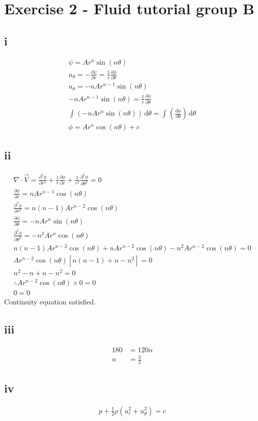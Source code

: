 \documentclass[class=report, crop=false, 12pt,a4paper]{standalone}
\begin{document}
\section*{Exercise 2 - Fluid tutorial group B}
\subsection*{i}
\begin{gather}
  \psi = A r^n \sin(n \theta)\\
  u_\theta = -\frac{\partial \psi }{\partial r}  = \frac{1}{r} \frac{\partial \phi }{\partial \theta } \\
  u_\theta = -nAr^{n-1} \sin(n\theta)\\
  -nAr^{n-1} \sin(n\theta) = \frac{1}{r} \frac{\partial \phi }{\partial \theta }\\
  \int_{}^{} \left( -nAr^{n} \sin(n\theta) \right) \,\mathrm{d}\theta = \int_{}^{} \left( \frac{\partial \phi }{\partial \theta } \right) \,\mathrm{d}\theta \\
  \phi = Ar^n\cos(n\theta) + c 
\end{gather}
\subsection*{ii}
\begin{gather}
  \nabla \cdot \vec{V} = \frac{\partial^2 \phi}{\partial r^2} + \frac{1}{r} \frac{\partial \phi}{\partial r} + \frac{1}{r^2}\frac{\partial^2\phi}{\partial \theta^2} = 0 \\
  \frac{\partial \phi}{\partial r} = nAr^{n-1}\cos(n\theta) \\
  \frac{\partial^2 \phi}{\partial r^2} = n(n-1)Ar^{n-2}\cos(n\theta)\\
  \frac{\partial\phi}{\partial \theta} = -nAr^n\sin(n\theta)\\
  \frac{\partial^2\phi}{\partial \theta^2} = -n^2Ar^n\cos(n\theta)\\
  n(n-1)Ar^{n-2}\cos(n\theta) + nAr^{n-2}\cos(n\theta) -n^2Ar^{n-2}\cos(n\theta) = 0\\
  Ar^{n-2}\cos(n\theta) \left[ n(n-1) + n - n^2 \right] = 0\\
  n^2 - n + n - n^2 = 0 \\
  \therefore Ar^{n-2}\cos(n\theta) \times 0 = 0 \\
  0 = 0 
\end{gather}
Continuity equation satisfied.
\subsection*{iii}
\begin{align}
  180 &= 120n\\
  n &= \frac{3}{2}
\end{align}
\subsection*{iv}
\begin{gather}
  p + \frac{1}{2} \rho \left( u_r^2 + u_\theta^2 \right) = c
\end{gather}
\end{document}
